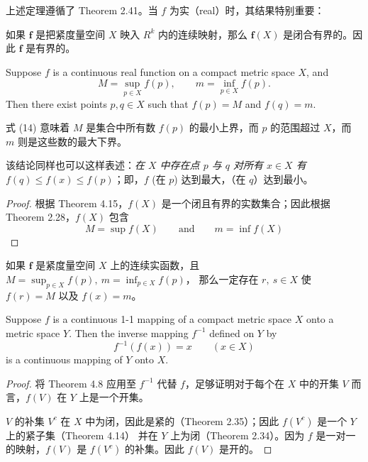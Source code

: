 \documentclass[../poma-notes.tex]{subfiles}
\begin{document}
上述定理遵循了 Theorem 2.41。当 $f$ 为实（real）时，其结果特别重要：

\begin{anote}
  如果 $\mathbf{f}$ 是把紧度量空间 $X$ 映入 $R^k$ 内的连续映射，那么 $\mathbf{f}(X)$ 是闭合有界的。因此 $\mathbf{f}$
  是有界的。
\end{anote}

\begin{theorem}
  Suppose $f$ is a continuous real function on a compact metric space $X$, and
  \begin{equation}
    M = \sup_{p \in X} f(p), \qquad m = \inf_{p \in X} f(p).
  \end{equation}
  Then there exist points $p, q \in X$ such that $f(p) = M$ and $f(q) = m$.
\end{theorem}

式 (14) 意味着 $M$ 是集合中所有数 $f(p)$ 的最小上界，而 $p$ 的范围超过 $X$，而 $m$ 则是这些数的最大下界。

该结论同样也可以这样表述：\textit{在 $X$ 中存在点 $p$ 与 $q$ 对所有 $x \in X$ 有 $f(q) \le f(x) \le f(p)$}；即，$f$
(在 $p$) 达到最大，（在 $q$）达到最小。

\begin{proof}
  根据 Theorem 4.15，$f(X)$ 是一个闭且有界的实数集合；因此根据 Theorem 2.28，$f(X)$ 包含
  \[
    M = \sup f(X) \qquad \text{and} \qquad m = \inf f(X)
  \]
\end{proof}

\begin{anote}
  如果 $\mathbf{f}$ 是紧度量空间 $X$ 上的连续实函数，且 $M = \sup_{p \in X} f(p),\ m = \inf_{p \in X} f(p)$，
  那么一定存在 $r,\ s \in X$ 使 $f(r) = M$ 以及 $f(x) = m$。
\end{anote}

\begin{theorem}
  Suppose $f$ is a continuous 1-1 mapping of a compact metric space $X$ onto a metric space $Y$. Then the
  inverse mapping $f^{-1}$ defined on $Y$ by
  \[
    f^{-1}(f(x)) = x \qquad (x \in X)
  \]
  is a continuous mapping of $Y$ onto $X$.
\end{theorem}

\begin{proof}
  将 Theorem 4.8 应用至 $f^{-1}$ 代替 $f$，足够证明对于每个在 $X$ 中的开集 $V$ 而言，$f(V)$ 在 $Y$ 上是一个开集。

  $V$ 的补集 $V^c$ 在 $X$ 中为闭，因此是紧的（Theorem 2.35）；因此 $f(V^c)$ 是一个 $Y$ 上的紧子集（Theorem 4.14）
  并在 $Y$ 上为闭（Theorem 2.34）。因为 $f$ 是一对一的映射，$f(V)$ 是 $f(V^c)$ 的补集。因此 $f(V)$ 是开的。
\end{proof}
\end{document}
